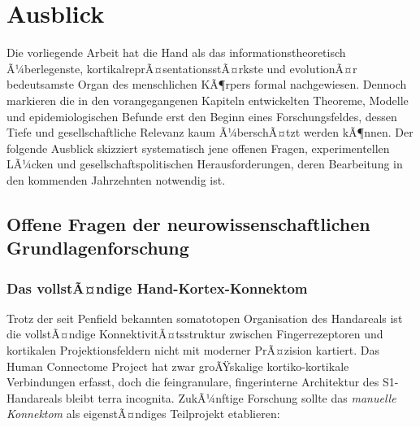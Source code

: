 ﻿\documentclass[12pt,a4paper]{report}
\theoremstyle{plain}
\theoremstyle{definition}
\theoremstyle{remark}
\begin{document}
\chapter{Ausblick}
\label{chap:ausblick}

Die vorliegende Arbeit hat die Hand als das informationstheoretisch
Ã¼berlegenste, kortikalreprÃ¤sentationsstÃ¤rkste und evolutionÃ¤r bedeutsamste
Organ des menschlichen KÃ¶rpers formal nachgewiesen. Dennoch markieren
die in den vorangegangenen Kapiteln entwickelten Theoreme, Modelle und
epidemiologischen Befunde erst den Beginn eines Forschungsfeldes, dessen
Tiefe und gesellschaftliche Relevanz kaum Ã¼berschÃ¤tzt werden kÃ¶nnen.
Der folgende Ausblick skizziert systematisch jene offenen Fragen,
experimentellen LÃ¼cken und gesellschaftspolitischen Herausforderungen,
deren Bearbeitung in den kommenden Jahrzehnten notwendig ist.

\section{Offene Fragen der neurowissenschaftlichen Grundlagenforschung}

\subsection{Das vollstÃ¤ndige Hand-Kortex-Konnektom}

Trotz der seit Penfield bekannten somatotopen Organisation des Handareals
ist die vollstÃ¤ndige KonnektivitÃ¤tsstruktur zwischen Fingerrezeptoren
und kortikalen Projektionsfeldern nicht mit moderner PrÃ¤zision kartiert.
Das Human Connectome Project hat zwar groÃŸskalige kortiko-kortikale
Verbindungen erfasst, doch die feingranulare, fingerinterne Architektur
des S1-Handareals bleibt terra incognita. ZukÃ¼nftige Forschung sollte
das \emph{manuelle Konnektom} als eigenstÃ¤ndiges Teilprojekt etablieren:
\end{document}
